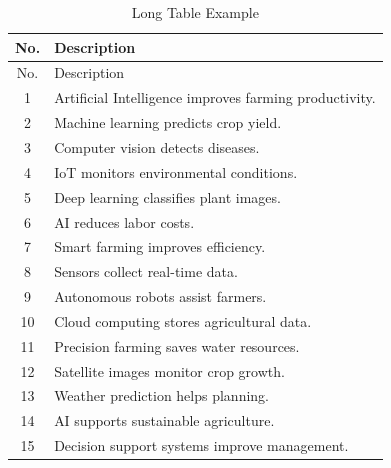 \documentclass[pdflatex,sn-mathphys-num]{sn-jnl}%
\theoremstyle{thmstyleone}%
\theoremstyle{thmstyletwo}%
\theoremstyle{thmstylethree}%
\begin{document}
\begin{center}

\small

\begin{longtable}{|c|p{8cm}|}

\caption{Long Table Example}
\label{tab:long}\\

\hline

No.&Description\\

\hline

\endfirsthead

\hline

No.&Description\\

\hline

\endhead

1&Artificial Intelligence improves farming productivity.\\

2&Machine learning predicts crop yield.\\

3&Computer vision detects diseases.\\

4&IoT monitors environmental conditions.\\

5&Deep learning classifies plant images.\\

6&AI reduces labor costs.\\

7&Smart farming improves efficiency.\\

8&Sensors collect real-time data.\\

9&Autonomous robots assist farmers.\\

10&Cloud computing stores agricultural data.\\

11&Precision farming saves water resources.\\

12&Satellite images monitor crop growth.\\

13&Weather prediction helps planning.\\

14&AI supports sustainable agriculture.\\

15&Decision support systems improve management.\\

\hline

\end{longtable}

\end{center}
\end{document}
